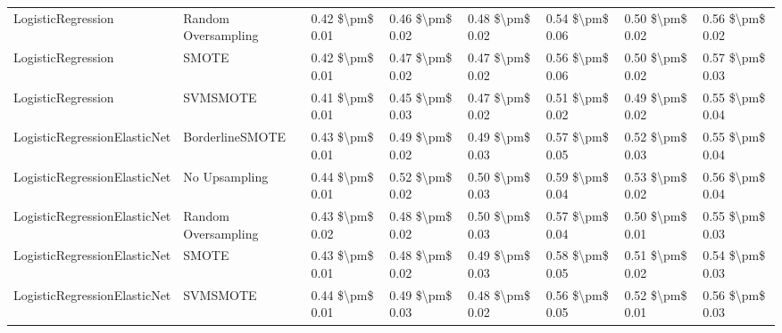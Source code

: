 \begin{tabular}{llllllll}
             LogisticRegression &           Random Oversampling & 0.42 \$\textbackslash pm\$ 0.01 &           0.46 \$\textbackslash pm\$ 0.02 &       0.48 \$\textbackslash pm\$ 0.02 &        0.54 \$\textbackslash pm\$ 0.06 &                         0.50 \$\textbackslash pm\$ 0.02 &     0.56 \$\textbackslash pm\$ 0.02 \\
             LogisticRegression &                         SMOTE & 0.42 \$\textbackslash pm\$ 0.01 &           0.47 \$\textbackslash pm\$ 0.02 &       0.47 \$\textbackslash pm\$ 0.02 &        0.56 \$\textbackslash pm\$ 0.06 &                         0.50 \$\textbackslash pm\$ 0.02 &     0.57 \$\textbackslash pm\$ 0.03 \\
             LogisticRegression &                      SVMSMOTE & 0.41 \$\textbackslash pm\$ 0.01 &           0.45 \$\textbackslash pm\$ 0.03 &       0.47 \$\textbackslash pm\$ 0.02 &        0.51 \$\textbackslash pm\$ 0.02 &                         0.49 \$\textbackslash pm\$ 0.02 &     0.55 \$\textbackslash pm\$ 0.04 \\
   LogisticRegressionElasticNet &               BorderlineSMOTE & 0.43 \$\textbackslash pm\$ 0.01 &           0.49 \$\textbackslash pm\$ 0.02 &       0.49 \$\textbackslash pm\$ 0.03 &        0.57 \$\textbackslash pm\$ 0.05 &                         0.52 \$\textbackslash pm\$ 0.03 &     0.55 \$\textbackslash pm\$ 0.04 \\
   LogisticRegressionElasticNet &                 No Upsampling & 0.44 \$\textbackslash pm\$ 0.01 &           0.52 \$\textbackslash pm\$ 0.02 &       0.50 \$\textbackslash pm\$ 0.03 &        0.59 \$\textbackslash pm\$ 0.04 &                         0.53 \$\textbackslash pm\$ 0.02 &     0.56 \$\textbackslash pm\$ 0.04 \\
   LogisticRegressionElasticNet &           Random Oversampling & 0.43 \$\textbackslash pm\$ 0.02 &           0.48 \$\textbackslash pm\$ 0.02 &       0.50 \$\textbackslash pm\$ 0.03 &        0.57 \$\textbackslash pm\$ 0.04 &                         0.50 \$\textbackslash pm\$ 0.01 &     0.55 \$\textbackslash pm\$ 0.03 \\
   LogisticRegressionElasticNet &                         SMOTE & 0.43 \$\textbackslash pm\$ 0.01 &           0.48 \$\textbackslash pm\$ 0.02 &       0.49 \$\textbackslash pm\$ 0.03 &        0.58 \$\textbackslash pm\$ 0.05 &                         0.51 \$\textbackslash pm\$ 0.02 &     0.54 \$\textbackslash pm\$ 0.03 \\
   LogisticRegressionElasticNet &                      SVMSMOTE & 0.44 \$\textbackslash pm\$ 0.01 &           0.49 \$\textbackslash pm\$ 0.03 &       0.48 \$\textbackslash pm\$ 0.02 &        0.56 \$\textbackslash pm\$ 0.05 &                         0.52 \$\textbackslash pm\$ 0.01 &     0.56 \$\textbackslash pm\$ 0.03 \\

\end{tabular}

